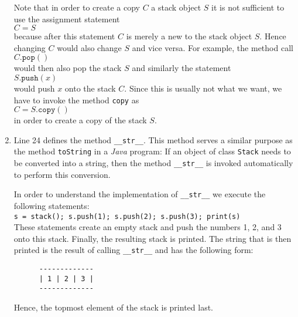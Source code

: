 \begin{enumerate}
      Note that in order to create a copy $C$ a stack object $S$ it is not sufficient to use the assignment statement
      \\[0.2cm]
      \hspace*{1.3cm}
      $C = S$
      \\[0.2cm]
      because after this statement $C$ is merely a new  to the stack object $S$.  Hence changing $C$
      would also change $S$ and vice versa.  For example, the method call
      \\[0.2cm]
      \hspace*{1.3cm}
      $C.\texttt{pop}()$
      \\[0.2cm]
      would then also pop the stack $S$ and similarly the statement
      \\[0.2cm]
      \hspace*{1.3cm}
      $S.\texttt{push}(x)$
      \\[0.2cm]
      would push $x$ onto the stack $C$.  Since this is usually not what we want, we have to invoke the method
      \texttt{copy} as 
      \\[0.2cm]
      \hspace*{1.3cm}
      $C = S.\texttt{copy}()$
      \\[0.2cm]
      in order to create a copy of the stack $S$.
\item Line 24 defines the method \texttt{\_\_str\_\_}.  This method serves a similar purpose as the method
      \texttt{toString} in a \textsl{Java} program:  If an object of class \texttt{Stack} needs to
      be converted into a string, then the method \texttt{\_\_str\_\_} is invoked automatically to
      perform this conversion.

      In order to understand the implementation of \texttt{\_\_str\_\_} we execute the following statements:
      \\[0.2cm]
      \hspace*{1.3cm}
      \texttt{s = stack(); s.push(1); s.push(2); s.push(3); print(s)}
      \\[0.2cm]
      These statements create an empty stack and push the numbers 1, 2, and 3 
      onto this stack.  Finally, the resulting stack is printed.  The string that is then printed
      is the result of calling \texttt{\_\_str\_\_} and has the following form:
      \begin{verbatim}
      -------------
      | 1 | 2 | 3 |
      -------------
      \end{verbatim}
      \vspace*{-0.5cm}
      Hence, the topmost element of the stack is printed last.


\end{enumerate}
